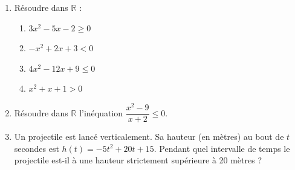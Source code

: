 \documentclass[11pt]{article}
\begin{document}
\begin{exercice}
\begin{enumerate}
    \item Résoudre dans $\mathbb{R}$ :
    \begin{enumerate}
        \item $3x^2 - 5x - 2 \geq 0$
        \item $-x^2 + 2x + 3 < 0$
        \item $4x^2 - 12x + 9 \leq 0$
        \item $x^2 + x + 1 > 0$
    \end{enumerate}
    \item Résoudre dans $\mathbb{R}$ l'inéquation $\dfrac{x^2-9}{x+2} \leq 0$.
    \item Un projectile est lancé verticalement. Sa hauteur (en mètres) au bout de $t$ secondes est $h(t) = -5t^2 + 20t + 15$. Pendant quel intervalle de temps le projectile est-il à une hauteur strictement supérieure à 20 mètres ?
\end{enumerate}
\end{exercice}
\end{document}
